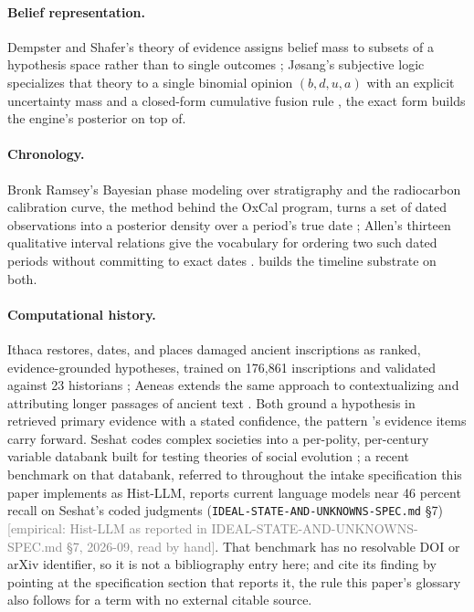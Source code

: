 \documentclass[11pt]{article}
\newcommand{\emp}[1]{\textcolor{gray}{\footnotesize [empirical: #1]}}
\begin{document}
\paragraph{Belief representation.} Dempster and Shafer's theory of
evidence assigns belief mass to subsets of a hypothesis space rather than
to single outcomes \autocite{dempster1967upper,shafer1976mathematical};
Jøsang's subjective logic specializes that theory to a single binomial
opinion $(b, d, u, a)$ with an explicit uncertainty mass and a closed-form
cumulative fusion rule \autocite{josang2016subjective}, the exact form
 builds the engine's posterior on top of.

\paragraph{Chronology.} Bronk Ramsey's Bayesian phase modeling over
stratigraphy and the radiocarbon calibration curve, the method behind the
OxCal program, turns a set of dated observations into a posterior density
over a period's true date \autocite{bronkramsey2009bayesian}; Allen's
thirteen qualitative interval relations give the vocabulary for ordering
two such dated periods without committing to exact dates
\autocite{allen1983interval}.  builds the timeline
substrate on both.

\paragraph{Computational history.} Ithaca restores, dates, and places
damaged ancient inscriptions as ranked, evidence-grounded hypotheses,
trained on 176,861 inscriptions and validated against 23 historians
\autocite{assael2022ithaca}; Aeneas extends the same approach to
contextualizing and attributing longer passages of ancient text
\autocite{assael2025aeneas}. Both ground a hypothesis in retrieved
primary evidence with a stated confidence, the pattern 's
evidence items carry forward. Seshat codes complex societies into a
per-polity, per-century variable databank built for testing theories of
social evolution \autocite{turchin2015seshat}; a recent benchmark on that
databank, referred to throughout the intake specification this paper
implements as Hist-LLM, reports current language models near 46 percent
recall on Seshat's coded judgments
(\texttt{IDEAL-STATE-AND-UNKNOWNS-SPEC.md} \S7) \emp{Hist-LLM as reported in IDEAL-STATE-AND-UNKNOWNS-SPEC.md \S7, 2026-09, read by hand}. That benchmark has no
resolvable DOI or arXiv identifier, so it is not a bibliography entry
here;  and  cite its finding
by pointing at the specification section that reports it, the rule this
paper's glossary also follows for a term with no external citable
source.
\end{document}
